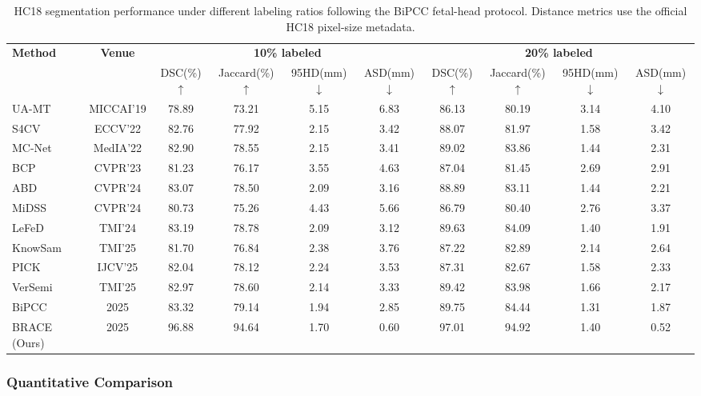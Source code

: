 \documentclass[a4paper,fleqn]{cas-dc}
\begin{document}
\begin{table}[!t]
\caption{HC18 segmentation performance under different labeling ratios following the BiPCC fetal-head protocol. Distance metrics use the official HC18 pixel-size metadata.}
\centering
\scriptsize
\setlength{\tabcolsep}{3pt}
\begin{tabular}{l|c|cccc|cccc}
\toprule
\multirow{2}{*}{\textbf{Method}} & \multirow{2}{*}{\textbf{Venue}} 
& \multicolumn{4}{c|}{\textbf{10\% labeled}} 
& \multicolumn{4}{c}{\textbf{20\% labeled}} \\
\cline{3-10}
& & DSC(\%)$\uparrow$ & Jaccard(\%)$\uparrow$ & 95HD(mm)$\downarrow$ & ASD(mm)$\downarrow$
  & DSC(\%)$\uparrow$ & Jaccard(\%)$\uparrow$ & 95HD(mm)$\downarrow$ & ASD(mm)$\downarrow$ \\
\hline
UA-MT~\cite{b41} & MICCAI’19 & 78.89 & 73.21 & 5.15 & 6.83 & 86.13 & 80.19 & 3.14 & 4.10 \\
S4CV~\cite{b42} & ECCV’22 & 82.76 & 77.92 & 2.15 & 3.42 & 88.07 & 81.97 & 1.58 & 3.42 \\
MC-Net~\cite{b43} & MedIA’22 & 82.90 & 78.55 & 2.15 & 3.41 & 89.02 & 83.86 & 1.44 & 2.31 \\
BCP~\cite{b44} & CVPR’23 & 81.23 & 76.17 & 3.55 & 4.63 & 87.04 & 81.45 & 2.69 & 2.91 \\
ABD~\cite{b45} & CVPR’24 & 83.07 & 78.50 & 2.09 & 3.16 & 88.89 & 83.11 & 1.44 & 2.21 \\
MiDSS~\cite{b46} & CVPR’24 & 80.73 & 75.26 & 4.43 & 5.66 & 86.79 & 80.40 & 2.76 & 3.37 \\
LeFeD~\cite{b47} & TMI’24 & 83.19 & 78.78 & 2.09 & 3.12 & 89.63 & 84.09 & 1.40 & 1.91 \\
KnowSam~\cite{b49} & TMI’25 & 81.70 & 76.84 & 2.38 & 3.76 & 87.22 & 82.89 & 2.14 & 2.64 \\
PICK~\cite{b48} & IJCV'25 & 82.04 & 78.12 & 2.24 & 3.53 & 87.31 & 82.67 & 1.58 & 2.33 \\
VerSemi~\cite{b50} & TMI’25 & 82.97 & 78.60 & 2.14 & 3.33 & 89.42 & 83.98 & 1.66 & 2.17 \\
BiPCC~\cite{b51} & 2025 & 83.32 & 79.14 & 1.94 & 2.85 
& 89.75 & 84.44 & 1.31 & 1.87 \\
BRACE (Ours) & 2025 & 96.88 & 94.64 & 1.70 & 0.60 
& 97.01 & 94.92 & 1.40 & 0.52 \\

\bottomrule
\end{tabular}
\label{tab:hc18_results}
\end{table}
\subsubsection{Quantitative Comparison}
\end{document}
